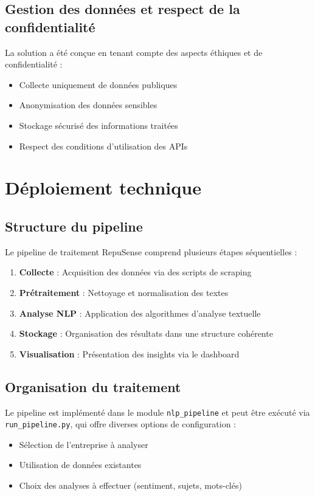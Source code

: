 \documentclass[12pt,a4paper]{report}
\begin{document}
\section{Gestion des données et respect de la confidentialité}
La solution a été conçue en tenant compte des aspects éthiques et de confidentialité :
\begin{itemize}
    \item Collecte uniquement de données publiques
    \item Anonymisation des données sensibles
    \item Stockage sécurisé des informations traitées
    \item Respect des conditions d'utilisation des APIs
\end{itemize}

\chapter{Déploiement technique}

\section{Structure du pipeline}
Le pipeline de traitement RepuSense comprend plusieurs étapes séquentielles :
\begin{enumerate}
    \item \textbf{Collecte} : Acquisition des données via des scripts de scraping
    \item \textbf{Prétraitement} : Nettoyage et normalisation des textes
    \item \textbf{Analyse NLP} : Application des algorithmes d'analyse textuelle
    \item \textbf{Stockage} : Organisation des résultats dans une structure cohérente
    \item \textbf{Visualisation} : Présentation des insights via le dashboard
\end{enumerate}

\section{Organisation du traitement}
Le pipeline est implémenté dans le module \texttt{nlp\_pipeline} et peut être exécuté via \texttt{run\_pipeline.py}, qui offre diverses options de configuration :
\begin{itemize}
    \item Sélection de l'entreprise à analyser
    \item Utilisation de données existantes
    \item Choix des analyses à effectuer (sentiment, sujets, mots-clés)
\end{itemize}
\end{document}
